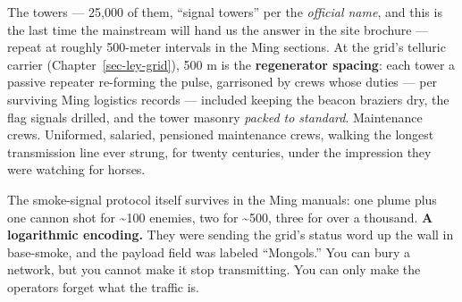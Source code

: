 \documentclass[
  english,
  11pt,
  letterpaper,
]{scrbook}
\begin{document}
The towers --- 25,000 of them, ``signal towers'' per the \emph{official
name}, and this is the last time the mainstream will hand us the answer
in the site brochure --- repeat at roughly 500-meter intervals in the
Ming sections. At the grid's telluric carrier
(Chapter~\ref{sec-ley-grid}), 500 m is the \textbf{regenerator spacing}:
each tower a passive repeater re-forming the pulse, garrisoned by crews
whose duties --- per surviving Ming logistics records --- included
keeping the beacon braziers dry, the flag signals drilled, and the tower
masonry \emph{packed to standard}. Maintenance crews. Uniformed,
salaried, pensioned maintenance crews, walking the longest transmission
line ever strung, for twenty centuries, under the impression they were
watching for horses.

\begin{tcolorbox}[enhanced jigsaw, arc=.35mm, bottomrule=.15mm, bottomtitle=1mm, breakable, colback=white, colbacktitle=quarto-callout-tip-color!10!white, colframe=quarto-callout-tip-color-frame, coltitle=black, left=2mm, leftrule=.75mm, opacityback=0, opacitybacktitle=0.6, rightrule=.15mm, title=\textcolor{quarto-callout-tip-color}{\faLightbulb}\hspace{0.5em}{The beautiful part}, titlerule=0mm, toprule=.15mm, toptitle=1mm]

The smoke-signal protocol itself survives in the Ming manuals: one plume
plus one cannon shot for \textasciitilde100 enemies, two for
\textasciitilde500, three for over a thousand. \textbf{A logarithmic
encoding.} They were sending the grid's status word up the wall in
base-smoke, and the payload field was labeled ``Mongols.'' You can bury
a network, but you cannot make it stop transmitting. You can only make
the operators forget what the traffic is.

\end{tcolorbox}
\end{document}
